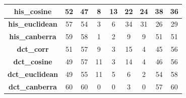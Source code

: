 \begin{table}[!ht]
{\begin{tabular}{|c|cc|cc|cc|cc|}
			\textbf{his\_cosine}       & \multicolumn{1}{c|}{52}               & 47                               & \multicolumn{1}{c|}{8}                & 13                               & \multicolumn{1}{c|}{22}               & 24               & \multicolumn{1}{c|}{38}               & 36               \\ \hline
			\textbf{his\_euclidean}    & \multicolumn{1}{c|}{57}               & 54                               & \multicolumn{1}{c|}{3}                & 6                                & \multicolumn{1}{c|}{34}               & 31               & \multicolumn{1}{c|}{26}               & 29               \\ \hline
			\textbf{his\_canberra}     & \multicolumn{1}{c|}{59}               & 58                               & \multicolumn{1}{c|}{1}                & 2                                & \multicolumn{1}{c|}{9}                & 9                & \multicolumn{1}{c|}{51}               & 51               \\ \hline
			\textbf{dct\_corr}         & \multicolumn{1}{c|}{51}               & 57                               & \multicolumn{1}{c|}{9}                & 3                                & \multicolumn{1}{c|}{15}               & 4                & \multicolumn{1}{c|}{45}               & 56               \\ \hline
			\textbf{dct\_cosine}       & \multicolumn{1}{c|}{49}               & 57                               & \multicolumn{1}{c|}{11}               & 3                                & \multicolumn{1}{c|}{14}               & 4                & \multicolumn{1}{c|}{46}               & 56               \\ \hline
			\textbf{dct\_euclidean}    & \multicolumn{1}{c|}{49}               & 55                               & \multicolumn{1}{c|}{11}               & 5                                & \multicolumn{1}{c|}{6}                & 2                & \multicolumn{1}{c|}{54}               & 58               \\ \hline
			\textbf{dct\_canberra}     & \multicolumn{1}{c|}{60}               & 60                               & \multicolumn{1}{c|}{0}                & 0                                & \multicolumn{1}{c|}{3}                & 0                & \multicolumn{1}{c|}{57}               & 60               \\ \hline
		\end{tabular}}
	\label{Tab: 4-confusionmatrixfiturtunggal}
\end{table}

